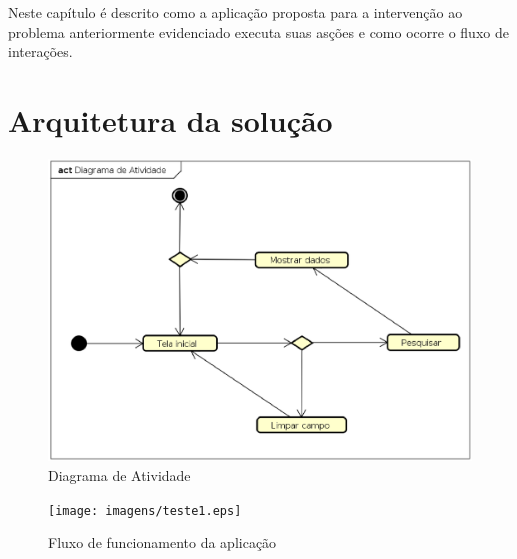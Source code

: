 Neste capítulo é descrito como a aplicação proposta para a intervenção ao problema anteriormente evidenciado executa suas asções e como ocorre o fluxo de interações.

\section{Arquitetura da solução}

\begin{figure}[!htb]
        \caption{\label{diagrama1}Diagrama de Atividade}
        \begin{center}
                \includegraphics[width=\textwidth]{imagens/teste.eps}
        \end{center}
\end{figure}


\begin{figure}[!htb]
        \caption{\label{diagrama1}Fluxo de funcionamento da aplicação}
        \begin{center}
                \texttt{[image: imagens/teste1.eps]}
        \end{center}
\end{figure}

